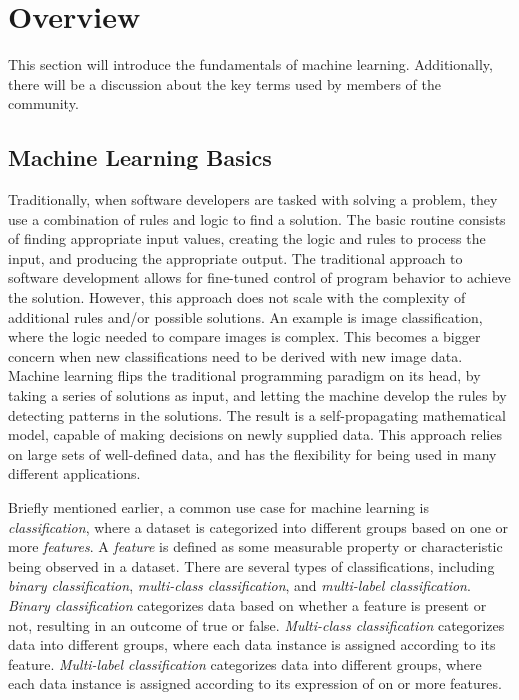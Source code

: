 \documentclass[11pt,conference]{IEEEtran}
\begin{document}
\section{Overview}
This section will introduce the fundamentals of machine learning. Additionally,
there will be a discussion about the key terms used by members of the community.

\subsection{Machine Learning Basics}
Traditionally, when software developers are tasked with solving a problem, they
use a combination of rules and logic to find a solution. The basic
routine consists of finding appropriate input values,
creating the logic and rules to process the input, and producing the appropriate output.
The traditional approach to software development allows for fine-tuned control
of program behavior to achieve the solution. However, this approach does not scale
with the complexity of additional rules and/or possible solutions. An
example is image classification, where the logic needed to compare images
is complex. This becomes a bigger concern when new classifications need to be
derived with new image data. Machine learning flips the traditional programming
paradigm on its head, by taking a series of solutions as input, and
letting the machine develop the rules by detecting patterns in the solutions.
The result is a self-propagating mathematical model, capable of making
decisions on newly supplied data. This approach relies on large sets of
well-defined data, and has the flexibility for being used in many different applications.

Briefly mentioned earlier, a common use case for machine learning is
\emph{classification}, where a dataset is categorized into different groups
based on one or more \emph{features}. A \emph{feature} is defined as some
measurable property or characteristic being observed in a dataset. There are several types of
classifications, including \emph{binary classification}, \emph{multi-class
classification}, and \emph{multi-label classification}. \emph{Binary
classification} categorizes data based on whether a feature is present or not,
resulting in an outcome of true or false. \emph{Multi-class classification}
categorizes data into different groups, where each data instance is assigned
according to its feature. \emph{Multi-label classification} categorizes data
into different groups, where each data instance is assigned according to its
expression of on or more features.
\end{document}
